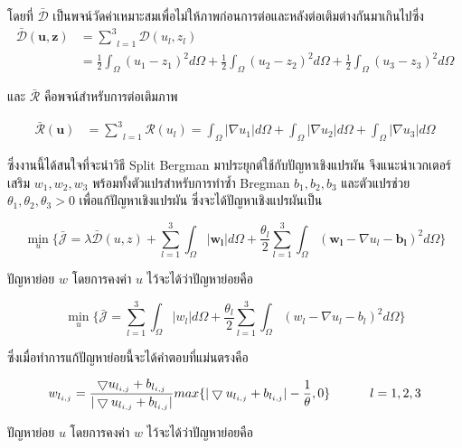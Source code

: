 \documentclass[hidelinks,a4paper,14pt]{article}
\numberwithin{equation}{section}							%
\begin{document}
{			โดยที่ $\mathcal{\bar{D}}$ เป็นพจน์วัดค่าเหมาะสมเพื่อไม่ให้ภาพก่อนการต่อและหลังต่อเติมต่างกันมาเกินไปซึ่ง
			\begin{align*}
			\mathcal{\bar{D}}(\boldsymbol{u},\boldsymbol{z})  &= \underset{l=1}{\overset{3}{\sum}}\mathcal{D}(u_l,z_l) \\
			&= \frac{1}{2}\int_{\Omega}^{}(u_1 - z_1)^2 d\Omega + \frac{1}{2}\int_{\Omega}^{}(u_2 - z_2)^2 d\Omega + \frac{1}{2}\int_{\Omega}^{}(u_3 - z_3)^2 d\Omega
			\end{align*}
			
			และ $ \mathcal{\bar{R}} $ คือพจน์สำหรับการต่อเติมภาพ 
			
			\begin{align*}
			\mathcal{\bar{R}}(\boldsymbol{u}) &= \underset{l=1}{\overset{3}{\sum}}\mathcal{R}(u_l) = \int_{\Omega}^{}\lvert\nabla u_1 \rvert d\Omega + \int_{\Omega}^{}\lvert\nabla u_2 \rvert d\Omega + \int_{\Omega}^{}\lvert\nabla u_3 \rvert d\Omega
			\end{align*}
			
			ซึ่งงานนี้ได้สนใจที่จะนำวิธี Split Bergman มาประยุกต์ใช้กับปัญหาเชิงแปรผัน จึงแนะนำเวกเตอร์เสริม $w_1, w_2, w_3$ พร้อมทั้งตัวแปรสำหรับการทำซ้ำ Bregman $b_1, b_2, b_3$ และตัวแปรช่วย $\theta_1, \theta_2, \theta_3 > 0 $ เพื่อแก้ปัญหาเชิงแปรผัน ซึ่งจะได้ปัญหาเชิงแปรผันเป็น
			
			$$ 
			\min_{u} \{\bar{\mathcal{J}}= \lambda \mathcal{\bar{D}}(u,z) +  \underset{l=1}{\overset{3}{\sum}} \int_{\Omega}^{}|\boldsymbol{w_l}|d\Omega
			+ \frac{\theta_l}{2} \underset{l=1}{\overset{3}{\sum}}\int_{\Omega}^{}(\boldsymbol{w_l} - \nabla u_l - \boldsymbol{b_l})^{2}d\Omega\}
			$$
			
			ปัญหาย่อย $w$ โดยการคงค่า $u$ ไว้จะได้ว่าปัญหาย่อยคือ
			
			$$ 
			\min_{u} \{\bar{\mathcal{J}}= \underset{l=1}{\overset{3}{\sum}} \int_{\Omega}^{}|{w_l}|d\Omega
			+ \frac{\theta_l}{2} \underset{l=1}{\overset{3}{\sum}}\int_{\Omega}^{}({w_l} - \nabla u_l - {b_l})^{2}d\Omega\}
			$$
			
			ซึ่งเมื่อทำการแก้ปัญหาย่อยนี้จะได้คำตอบที่แม่นตรงคือ
			
			$$ w_{l_{i,j}} = \frac{\bigtriangledown u_{l_{i,j}}  + b_{l_{i,j}} }{ | \bigtriangledown u_{l_{i,j}}  + b_{l_{i,j}} | } max \{  | \bigtriangledown u_{l_{i,j}}  + b_{l_{i,j}} | - \frac{1}{\theta} , 0\} \hspace{1cm}  \hspace{0.1cm} l = 1,2,3$$ 
			
			
			ปัญหาย่อย $u$ โดยการคงค่า $w$ ไว้จะได้ว่าปัญหาย่อยคือ
			
}
\end{document}
